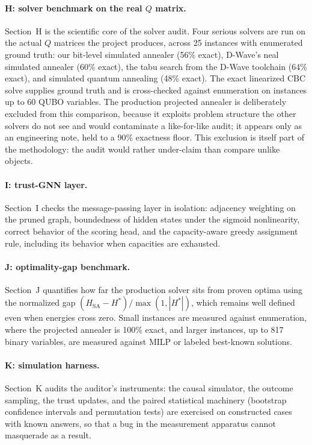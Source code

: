\paragraph{H: solver benchmark on the real $Q$ matrix.}
Section~H is the scientific core of the solver audit. Four serious solvers
are run on the actual $Q$ matrices the project produces, across 25
instances with enumerated ground truth: our bit-level simulated annealer
(56\% exact), D-Wave's neal simulated annealer (60\% exact), the tabu
search from the D-Wave toolchain (64\% exact), and simulated quantum
annealing (48\% exact). The exact linearized CBC solve supplies ground
truth and is cross-checked against enumeration on instances up to 60 QUBO
variables. The production projected annealer is deliberately excluded from
this comparison, because it exploits problem structure the other solvers do
not see and would contaminate a like-for-like audit; it appears only as an
engineering note, held to a 90\% exactness floor. This exclusion is itself
part of the methodology: the audit would rather under-claim than compare
unlike objects.

\paragraph{I: trust-GNN layer.}
Section~I checks the message-passing layer in isolation: adjacency
weighting on the pruned graph, boundedness of hidden states under the
sigmoid nonlinearity, correct behavior of the scoring head, and the
capacity-aware greedy assignment rule, including its behavior when
capacities are exhausted.

\paragraph{J: optimality-gap benchmark.}
Section~J quantifies how far the production solver sits from proven optima
using the normalized gap $(H_{\mathrm{SA}} - H^{*}) / \max(1, |H^{*}|)$,
which remains well defined even when energies cross zero. Small instances
are measured against enumeration, where the projected annealer is 100\%
exact, and larger instances, up to 817 binary variables, are measured
against MILP or labeled best-known solutions.

\paragraph{K: simulation harness.}
Section~K audits the auditor's instruments: the causal simulator, the
outcome sampling, the trust updates, and the paired statistical machinery
(bootstrap confidence intervals and permutation tests) are exercised on
constructed cases with known answers, so that a bug in the measurement
apparatus cannot masquerade as a result.

